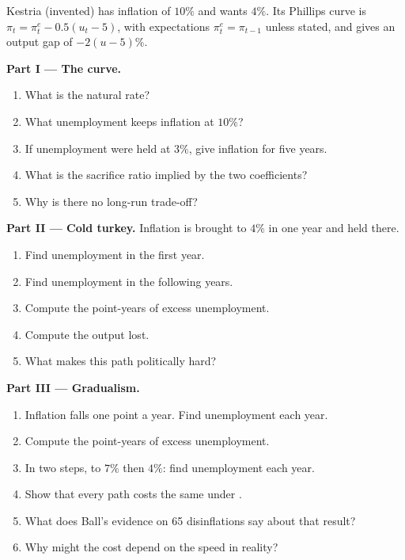 \begin{problem}\label{pb:b1:aggregate-supply:kestria}
Kestria (invented) has inflation of $10\%$ and wants $4\%$. Its Phillips curve
is $\pi_t = \pi^e_t - 0.5(u_t - 5)$, with expectations $\pi^e_t = \pi_{t-1}$ unless stated, and
 gives an output gap of $-2(u - 5)\%$.

\medskip\noindent\textbf{Part I --- The curve.}
\begin{enumerate}
  \item What is the natural rate?
  \item What unemployment keeps inflation at $10\%$?
  \item If unemployment were held at $3\%$, give inflation for five years.
  \item What is the sacrifice ratio implied by the two coefficients?
  \item Why is there no long-run trade-off?
\end{enumerate}

\medskip\noindent\textbf{Part II --- Cold turkey.} Inflation is brought to $4\%$ in one
year and held there.
\begin{enumerate}[resume]
  \item Find unemployment in the first year.
  \item Find unemployment in the following years.
  \item Compute the point-years of excess unemployment.
  \item Compute the output lost.
  \item What makes this path politically hard?
\end{enumerate}

\medskip\noindent\textbf{Part III --- Gradualism.}
\begin{enumerate}[resume]
  \item Inflation falls one point a year. Find unemployment each year.
  \item Compute the point-years of excess unemployment.
  \item In two steps, to $7\%$ then $4\%$: find unemployment each year.
  \item Show that every path costs the same under .
  \item What does Ball's evidence on 65 disinflations say about that result?
  \item Why might the cost depend on the speed in reality?
\end{enumerate}


\end{problem}
